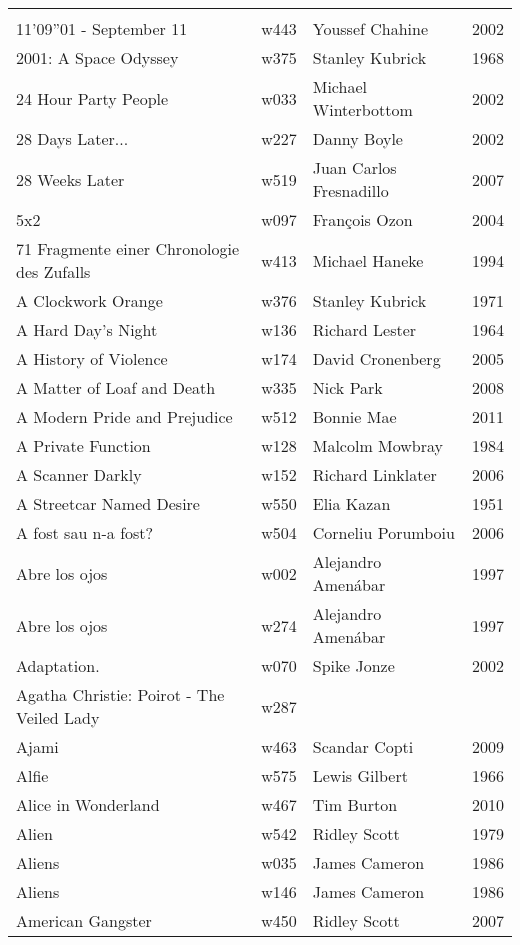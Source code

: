 \documentclass{article}
\begin{document}
\begin {center}
\begin{longtable}{p{10cm} l l l}
\hline
\\
11'09''01 - September 11 & w443 & Youssef Chahine & 2002 \\
2001: A Space Odyssey & w375 & Stanley Kubrick & 1968 \\
24 Hour Party People & w033 & Michael Winterbottom & 2002 \\
28 Days Later... & w227 & Danny Boyle & 2002 \\
28 Weeks Later & w519 & Juan Carlos Fresnadillo & 2007 \\
5x2 & w097 & François Ozon & 2004 \\
71 Fragmente einer Chronologie des Zufalls & w413 & Michael Haneke & 1994 \\
A Clockwork Orange & w376 & Stanley Kubrick & 1971 \\
A Hard Day's Night & w136 & Richard Lester & 1964 \\
A History of Violence & w174 & David Cronenberg & 2005 \\
A Matter of Loaf and Death & w335 & Nick Park & 2008 \\
A Modern Pride and Prejudice & w512 & Bonnie Mae & 2011 \\
A Private Function & w128 & Malcolm Mowbray & 1984 \\
A Scanner Darkly & w152 & Richard Linklater & 2006 \\
A Streetcar Named Desire & w550 & Elia Kazan & 1951 \\
A fost sau n-a fost? & w504 & Corneliu Porumboiu & 2006 \\
Abre los ojos & w002 & Alejandro Amenábar & 1997 \\
Abre los ojos & w274 & Alejandro Amenábar & 1997 \\
Adaptation. & w070 & Spike Jonze & 2002 \\
Agatha Christie: Poirot - The Veiled Lady & w287 &  &  \\
Ajami & w463 & Scandar Copti & 2009 \\
Alfie & w575 & Lewis Gilbert & 1966 \\
Alice in Wonderland & w467 & Tim Burton & 2010 \\
Alien & w542 & Ridley Scott & 1979 \\
Aliens & w035 & James Cameron & 1986 \\
Aliens & w146 & James Cameron & 1986 \\
American Gangster & w450 & Ridley Scott & 2007 \\

\end{longtable}
\end{center}
\end{document}

